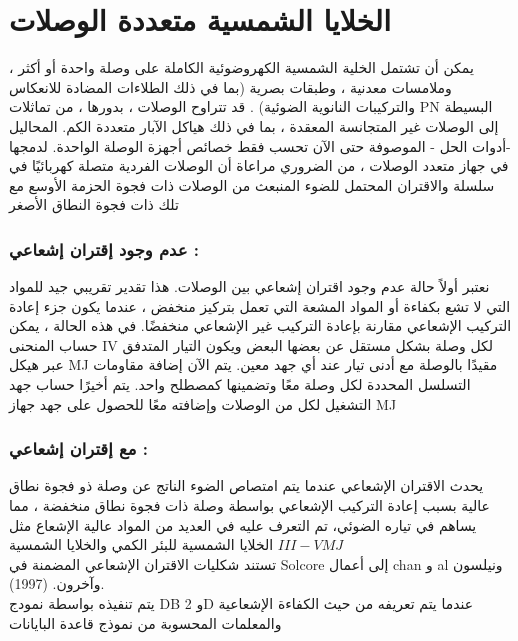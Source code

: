 \section{ الخلايا الشمسية متعددة الوصلات}
يمكن أن تشتمل الخلية الشمسية الكهروضوئية الكاملة على وصلة واحدة أو أكثر ، وملامسات معدنية ، وطبقات بصرية (بما في ذلك الطلاءات المضادة للانعكاس والتركيبات النانوية الضوئية) . قد تتراوح الوصلات  ، بدورها ، من تماثلات PN البسيطة إلى الوصلات غير المتجانسة المعقدة ، بما في ذلك هياكل الآبار متعددة الكم. المحاليل -أدوات الحل - الموصوفة حتى الآن تحسب فقط خصائص أجهزة الوصلة الواحدة. لدمجها في جهاز متعدد الوصلات ، من الضروري مراعاة أن الوصلات الفردية متصلة كهربائيًا في سلسلة والاقتران المحتمل للضوء المنبعث من الوصلات ذات فجوة الحزمة الأوسع مع تلك ذات فجوة النطاق الأصغر
\subsubsection{ عدم وجود إقتران إشعاعي :}
نعتبر أولاً حالة عدم وجود اقتران إشعاعي بين الوصلات. هذا تقدير تقريبي جيد للمواد التي لا تشع بكفاءة أو المواد المشعة التي تعمل بتركيز منخفض ، عندما يكون جزء إعادة التركيب الإشعاعي مقارنة بإعادة التركيب غير الإشعاعي منخفضًا. في هذه الحالة ، يمكن حساب المنحنى IV لكل  وصلة  بشكل مستقل عن بعضها البعض ويكون التيار المتدفق عبر هيكل MJ مقيدًا بالوصلة  مع أدنى تيار عند أي جهد معين. يتم الآن إضافة مقاومات التسلسل المحددة لكل وصلة  معًا وتضمينها كمصطلح واحد. يتم أخيرًا حساب جهد التشغيل لكل من الوصلات وإضافته معًا للحصول على جهد جهاز MJ
\subsubsection{مع إقتران إشعاعي :}
يحدث الاقتران الإشعاعي عندما يتم امتصاص الضوء الناتج عن وصلة  ذو فجوة نطاق عالية بسبب إعادة التركيب الإشعاعي بواسطة وصلة ذات فجوة نطاق منخفضة ، مما يساهم في تياره الضوئي، تم التعرف عليه في العديد من المواد عالية الإشعاع مثل الخلايا الشمسية للبئر الكمي والخلايا الشمسية $ III-V MJ   $\\
تستند شكليات الاقتران الإشعاعي المضمنة في Solcore إلى أعمال  chan و al  ونيلسون وآخرون. (1997).  \\
يتم تنفيذه بواسطة نمودج DB و 2D عندما يتم تعريفه من حيث الكفاءة الإشعاعية والمعلمات المحسوبة من نموذج قاعدة البايانات  
